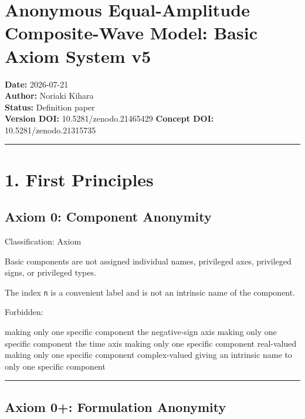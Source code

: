 \documentclass[
  a4paper,
]{article}
\author{}
\date{}
\newenvironment{Shaded}{}{}
\newcommand{\NormalTok}[1]{#1}
\begin{document}
\section{Anonymous Equal-Amplitude Composite-Wave Model: Basic Axiom
System
v5}\label{anonymous-equal-amplitude-composite-wave-model-basic-axiom-system-v5}

\textbf{Date:} 2026-07-21\\
\textbf{Author:} Noriaki Kihara\\
\textbf{Status:} Definition paper\\
\textbf{Version DOI:} 10.5281/zenodo.21465429 \textbf{Concept DOI:}
10.5281/zenodo.21315735

\begin{center}\rule{0.5\linewidth}{0.5pt}\end{center}

\section{1. First Principles}\label{first-principles}

\subsection{Axiom 0: Component
Anonymity}\label{axiom-0-component-anonymity}

Classification: Axiom

Basic components are not assigned individual names, privileged axes,
privileged signs, or privileged types.

The index \texttt{n} is a convenient label and is not an intrinsic name
of the component.

Forbidden:

\begin{Shaded}
\begin{Highlighting}[]
\NormalTok{making only one specific component the negative{-}sign axis}
\NormalTok{making only one specific component the time axis}
\NormalTok{making only one specific component real{-}valued}
\NormalTok{making only one specific component complex{-}valued}
\NormalTok{giving an intrinsic name to only one specific component}
\end{Highlighting}
\end{Shaded}

\begin{center}\rule{0.5\linewidth}{0.5pt}\end{center}

\subsection{Axiom 0+: Formulation
Anonymity}\label{axiom-0-formulation-anonymity}
\end{document}
